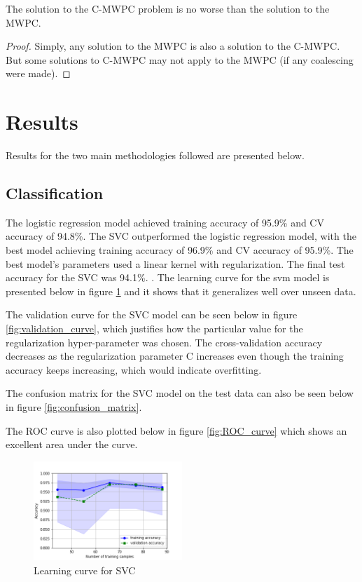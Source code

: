 \documentclass[acmtog, authorversion]{acmart}
\begin{document}
\begin{lemma}The solution to the C-MWPC problem is no
worse than the solution to the MWPC.
\end{lemma}
\begin{proof}
Simply, any solution to the MWPC is also a solution to the
C-MWPC. But some solutions to C-MWPC may not apply to the MWPC (if any
coalescing were made).
\end{proof}

\section{Results}

Results for the two main methodologies followed are presented below.


\subsection{Classification}
The logistic regression model achieved training accuracy of 95.9\% and CV accuracy of 94.8\%. The SVC outperformed the logistic regression model, with the best model achieving training accuracy of 96.9\% and CV accuracy of 95.9\%. The best model's parameters used a linear kernel with regularization. The final test accuracy for the SVC was 94.1\%. .
The learning curve for the svm model is presented below in figure \ref{fig:learning_curve} and it shows that it generalizes well over unseen data.
\newline

The validation curve for the SVC model can be seen below in figure \ref{fig:validation_curve}, which justifies how the particular value for the regularization hyper-parameter was chosen. The cross-validation accuracy decreases as the regularization parameter C increases even though the training accuracy keeps increasing, which would indicate overfitting.

The confusion matrix for the SVC model on the test data can also be seen below in figure \ref{fig:confusion_matrix}.

The ROC curve is also plotted below in figure \ref{fig:ROC_curve} which shows an excellent area under the curve.

\begin{figure}[h]
  \includegraphics[width=0.5\textwidth]{learning_curve}
  \caption{Learning curve for SVC}
  \label{fig:learning_curve}
\end{figure}
\end{document}
